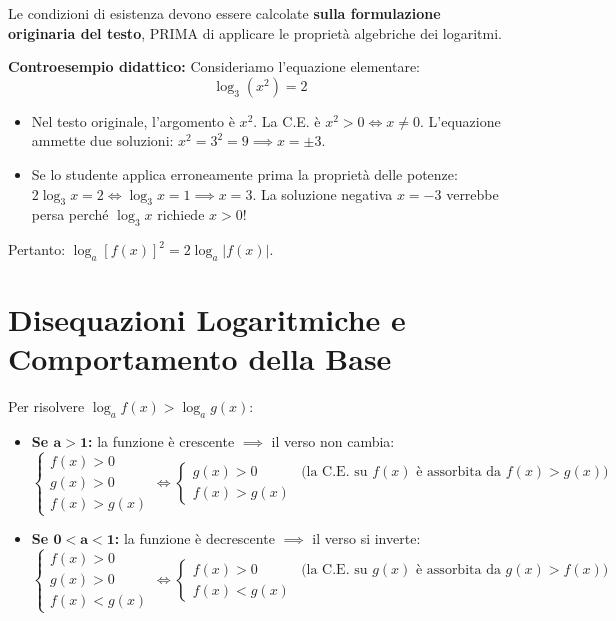 \documentclass[11pt,a4paper,oneside]{report}
\begin{document}
\begin{attenzione}
Le condizioni di esistenza devono essere calcolate \textbf{sulla formulazione originaria del testo}, PRIMA di applicare le proprietà algebriche dei logaritmi.

\textbf{Controesempio didattico:}
Consideriamo l'equazione elementare:
\begin{equation*}
    \log_3 (x^2) = 2
\end{equation*}
\begin{itemize}
    \item Nel testo originale, l'argomento è $x^2$. La C.E. è $x^2 > 0 \iff x \neq 0$. L'equazione ammette due soluzioni: $x^2 = 3^2 = 9 \implies x = \pm 3$.
    \item Se lo studente applica erroneamente prima la proprietà delle potenze: $2 \log_3 x = 2 \iff \log_3 x = 1 \implies x = 3$. La soluzione negativa $x = -3$ verrebbe persa perché $\log_3 x$ richiede $x > 0$!
\end{itemize}
Pertanto: $\log_a [f(x)]^2 = 2 \log_a |f(x)|$.
\end{attenzione}

\section{Disequazioni Logaritmiche e Comportamento della Base}
Per risolvere $\log_a f(x) > \log_a g(x)$:
\begin{itemize}
    \item \textbf{Se $\mathbf{a > 1}$:} la funzione è crescente $\implies$ il verso non cambia:
    \begin{equation}
        \begin{cases}
            f(x) > 0 \\[1.5ex]
            g(x) > 0 \\[1.5ex]
            f(x) > g(x)
        \end{cases} \iff
        \begin{cases}
            g(x) > 0 & \text{(la C.E. su $f(x)$ è assorbita da $f(x) > g(x)$)} \\[1.5ex]
            f(x) > g(x)
        \end{cases}
    \end{equation}
    \item \textbf{Se $\mathbf{0 < a < 1}$:} la funzione è decrescente $\implies$ il verso si inverte:
    \begin{equation}
        \begin{cases}
            f(x) > 0 \\[1.5ex]
            g(x) > 0 \\[1.5ex]
            f(x) < g(x)
        \end{cases} \iff
        \begin{cases}
            f(x) > 0 & \text{(la C.E. su $g(x)$ è assorbita da $g(x) > f(x)$)} \\[1.5ex]
            f(x) < g(x)
        \end{cases}
    \end{equation}
\end{itemize}
\end{document}
